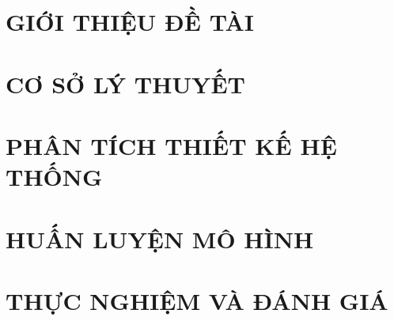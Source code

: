 \documentclass[a4paper,13pt,3p,twoside]{report}
\theoremstyle{definition}
\begin{document}

\newpage
 

\newpage



\newpage
{}

\pagestyle{fancy}
\fancyhf{}
\fancyhead[RE, LO]{\leftmark}
\fancyfoot[RE, LO]{\thepage}

\chapter{GIỚI THIỆU ĐỀ TÀI}
\label{chapter:Introduction}

\newpage
\chapter{CƠ SỞ LÝ THUYẾT}
\label{chapter:Related_works}



\newpage
\chapter{PHÂN TÍCH THIẾT KẾ HỆ THỐNG}
\label{chapter:Methodology}


\newpage
\chapter{HUẤN LUYỆN MÔ HÌNH}
\label{chapter:Experiment}


\newpage
\chapter{THỰC NGHIỆM VÀ ĐÁNH GIÁ}
\label{chapter:SolutionAndContribution}

\newpage
\end{document}

